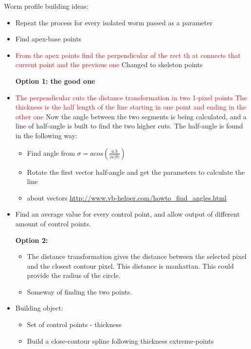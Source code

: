\documentclass{article}
\begin{document}
Worm profile building ideas:
\begin{itemize}
\item Repeat the process for every isolated worm passed as a parameter
\item Find apex-base points
\item \textcolor{red}{From the apex points find the perpendicular of the rect th
at connects that current point and the previous one} Changed to skeleton points

\textbf{Option 1: the good one}
\item \textcolor{red}{The perpendicular cuts the distance transformation in two 1-pixel points
  The thickness is the half length of the line starting in one point and ending
  in the other one} Now the angle between the two segments is being calculated, and a line of half-angle is built to find the two higher cuts. The half-angle is found in the following way:
\begin{itemize}
\item Find angle from $\sigma = acos(\frac{a.b}{|a||b|})$
\item Rotate the first vector half-angle and get the parameters
  to calculate the line
\item about vectors \url{http://www.vb-helper.com/howto_find_angles.html}
\end{itemize}
\item Find an average value for every control point, and allow output of different amount of control points.

\textbf{Option 2:}
\begin{itemize}
\item The distance transformation gives the distance between the selected
pixel and the closest contour pixel. This distance is manhattan. This could
provide the radius of the circle.
\item Someway of finding the two points.
\end{itemize}


\item Building object:
  \begin{itemize}
  \item Set of control points - thickness
  \item Build a close-contour spline following thickness extreme-points
  \end{itemize}
\end{itemize}
\end{document}
